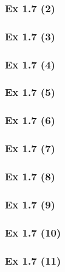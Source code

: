 \subsubsection{Ex 1.7 (2)}\label{sec:Ex_1.7.2}

\subsubsection{Ex 1.7 (3)}\label{sec:Ex_1.7.3}

\subsubsection{Ex 1.7 (4)}\label{sec:Ex_1.7.4}

\subsubsection{Ex 1.7 (5)}\label{sec:Ex_1.7.5}

\subsubsection{Ex 1.7 (6)}\label{sec:Ex_1.7.6}

\subsubsection{Ex 1.7 (7)}\label{sec:Ex_1.7.7}

\subsubsection{Ex 1.7 (8)}\label{sec:Ex_1.7.8}

\subsubsection{Ex 1.7 (9)}\label{sec:Ex_1.7.9}

\subsubsection{Ex 1.7 (10)}\label{sec:Ex_1.7.10}

\newpage		%

\subsubsection{Ex 1.7 (11)}\label{sec:Ex_1.7.11}

